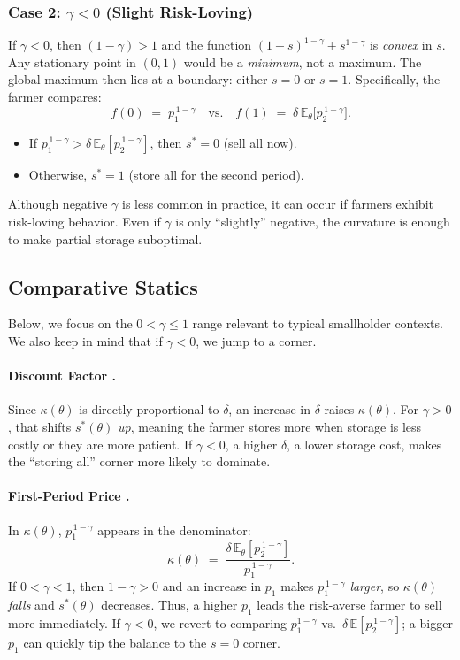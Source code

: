 \documentclass[12pt]{article}
\begin{document}
\subsubsection{Case 2: \(\gamma<0\) (Slight Risk-Loving)}

If \(\gamma<0\), then \((1-\gamma)>1\) and the function \((1-s)^{1-\gamma} + s^{1-\gamma}\) is \emph{convex} in \(s\). Any stationary point in \((0,1)\) would be a \emph{minimum}, not a maximum. The global maximum then lies at a boundary: either $s=0$ or $s=1$. Specifically, the farmer compares:
\[
f(0)\;=\;p_1^{\,1-\gamma}
\quad\text{vs.}\quad
f(1)\;=\;\delta\,\mathbb{E}_\theta\bigl[p_2^{\,1-\gamma}\bigr].
\]
\begin{itemize}
    \item If $p_1^{\,1-\gamma} > \delta\,\mathbb{E}_\theta[p_2^{\,1-\gamma}]$, then $s^*=0$ (sell all now).
    \item Otherwise, $s^*=1$ (store all for the second period).
\end{itemize}

Although negative \(\gamma\) is less common in practice, it can occur if farmers exhibit risk-loving behavior. Even if $\gamma$ is only ``slightly'' negative, the curvature is enough to make partial storage suboptimal. 

\subsection{Comparative Statics}

Below, we focus on the \(0 < \gamma \le 1\) range relevant to typical smallholder contexts. We also keep in mind that if $\gamma<0$, we jump to a corner.

\paragraph{Discount Factor \boldmath{$\delta$}.}
Since $\kappa(\theta)$ is directly proportional to $\delta$, an increase in $\delta$ raises $\kappa(\theta)$. For $\gamma>0$, that shifts $s^*(\theta)$ \emph{up}, meaning the farmer stores more when storage is less costly or they are more patient. If $\gamma<0$, a higher $\delta$, a lower storage cost, makes the ``storing all'' corner more likely to dominate.

\paragraph{First-Period Price .}
In $\kappa(\theta)$, $p_1^{\,1-\gamma}$ appears in the denominator:
\[
\kappa(\theta) 
\;=\; 
\frac{\delta\,\mathbb{E}_\theta[p_2^{\,1-\gamma}]}{\,p_1^{\,1-\gamma}\,}.
\]
If $0<\gamma<1$, then $1-\gamma>0$ and an increase in $p_1$ makes $p_1^{\,1-\gamma}$ \emph{larger}, so $\kappa(\theta)$ \emph{falls} and $s^*(\theta)$ decreases. Thus, a higher $p_1$ leads the risk-averse farmer to sell more immediately. If $\gamma<0$, we revert to comparing $p_1^{1-\gamma}$ vs.\ $\delta\,\mathbb{E}[p_2^{\,1-\gamma}]$; a bigger $p_1$ can quickly tip the balance to the $s=0$ corner.
\end{document}
